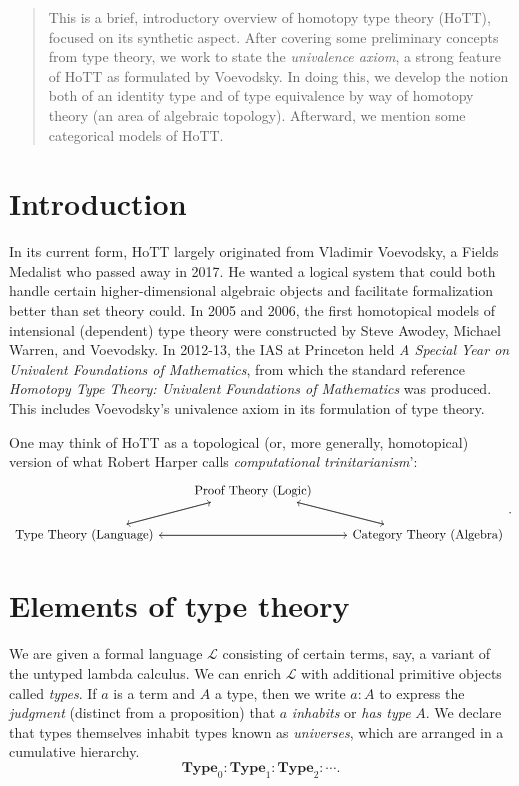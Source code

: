 \documentclass[10pt,letterpaper,cm]{nupset}
\theoremstyle{definition}
\theoremstyle{theorem}
\theoremstyle{remark}
\newcommand{\1}{\mathbf{1}}
\newcommand{\0}{\vec 0}
\begin{document}
\thispagestyle{empty}
\begin{abstract}
This is a brief, introductory overview of homotopy type theory (HoTT), focused on its synthetic aspect. After covering some preliminary concepts from type theory, we work to state the \textit{univalence axiom}, a strong feature of HoTT as formulated by Voevodsky. In doing this, we develop the notion both of an identity type and of type equivalence by way of homotopy theory (an area of algebraic topology). Afterward, we mention some categorical models of HoTT.
\end{abstract}



\tableofcontents
\newpage


\section*{Introduction}

In its current form, HoTT largely originated from Vladimir Voevodsky, a Fields Medalist who passed away in 2017. He wanted a logical system that could both handle certain higher-dimensional algebraic objects and facilitate formalization better than set theory could. In 2005 and 2006, the first homotopical models of intensional (dependent) type theory were constructed by Steve Awodey, Michael Warren, and Voevodsky. In 2012-13,  the IAS at Princeton held \textit{A Special Year on Univalent Foundations of Mathematics}, from which the standard reference \textit{Homotopy Type Theory: Univalent Foundations of Mathematics} was produced. This includes Voevodsky's univalence axiom in its formulation of type theory.

One may think of HoTT as a topological (or, more generally, homotopical) version of what Robert Harper calls \textit{computational trinitarianism}':
\[
\begin{tikzcd}
 & \text{Proof Theory (Logic)} \arrow[rd] \arrow[ld] &  \\
\text{Type Theory (Language)} \arrow[ru] \arrow[rr] &  & \text{Category Theory (Algebra)} \arrow[lu] \arrow[ll]
\end{tikzcd}
.\]

\section{Elements of type theory}

We are given a formal language $\mathcal{L}$ consisting of certain terms, say, a variant of the untyped lambda calculus. We can enrich $\mathcal{L}$ with additional primitive objects called \textit{types}. If $a$ is a term and $A$ a type, then we write $a: A$ to express the \textit{judgment} (distinct from a proposition) that $a$ \textit{inhabits} or \textit{has type} $A$. We declare that types themselves inhabit types known as \textit{universes}, which are arranged in a cumulative hierarchy. $$\mathbf{Type}_0 :\mathbf{Type}_1 : \mathbf{Type}_2 : \cdots . $$ 
\end{document}
